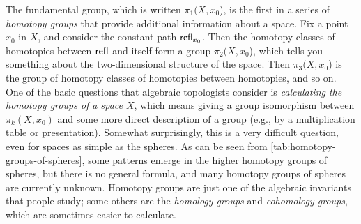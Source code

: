 The fundamental group, which is written $\pi_1(X,x_0$), is the first in
a series of \emph{homotopy groups} that provide additional information
about a space.  Fix a point $x_0$ in $X$, and consider the constant path
$\mathsf{refl}_{x_0}$.  Then the homotopy classes of homotopies between $\mathsf{refl}_{}$ and itself form a
group $\pi_2(X,x_0$), which tells you
something about the two-dimensional structure of the space.  Then
$\pi_3(X,x_0$) is the group of homotopy classes of homotopies between homotopies, and so on.
One of the basic questions that algebraic topologists consider is
\emph{calculating the homotopy groups of a space $X$}, which means
giving a group isomorphism between $\pi_k(X,x_0)$ and some more direct
description of a group (e.g., by a multiplication table or
presentation).  Somewhat surprisingly, this is a very difficult
question, even for spaces as simple as the spheres.
As can be seen from \cref{tab:homotopy-groups-of-spheres},
some patterns emerge in the higher homotopy groups of spheres,
but there is no general formula, and many
homotopy groups of spheres are currently unknown.  Homotopy groups are
just one of the algebraic invariants that people study; some others are
the \emph{homology groups} and \emph{cohomology groups}, which are
sometimes easier to calculate.


